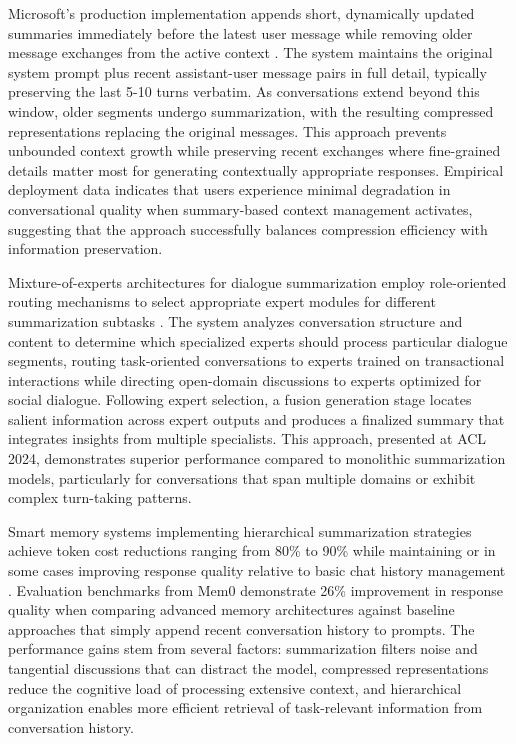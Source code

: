 \documentclass[11pt,letterpaper]{article}
\begin{document}
Microsoft's production implementation appends short, dynamically updated summaries immediately before the latest user message while removing older message exchanges from the active context \cite{microsoft2024infinite}. The system maintains the original system prompt plus recent assistant-user message pairs in full detail, typically preserving the last 5-10 turns verbatim. As conversations extend beyond this window, older segments undergo summarization, with the resulting compressed representations replacing the original messages. This approach prevents unbounded context growth while preserving recent exchanges where fine-grained details matter most for generating contextually appropriate responses. Empirical deployment data indicates that users experience minimal degradation in conversational quality when summary-based context management activates, suggesting that the approach successfully balances compression efficiency with information preservation.

Mixture-of-experts architectures for dialogue summarization employ role-oriented routing mechanisms to select appropriate expert modules for different summarization subtasks \cite{wang2024dialogue}. The system analyzes conversation structure and content to determine which specialized experts should process particular dialogue segments, routing task-oriented conversations to experts trained on transactional interactions while directing open-domain discussions to experts optimized for social dialogue. Following expert selection, a fusion generation stage locates salient information across expert outputs and produces a finalized summary that integrates insights from multiple specialists. This approach, presented at ACL 2024, demonstrates superior performance compared to monolithic summarization models, particularly for conversations that span multiple domains or exhibit complex turn-taking patterns.

Smart memory systems implementing hierarchical summarization strategies achieve token cost reductions ranging from 80\% to 90\% while maintaining or in some cases improving response quality relative to basic chat history management \cite{mem0ai2025guide}. Evaluation benchmarks from Mem0 demonstrate 26\% improvement in response quality when comparing advanced memory architectures against baseline approaches that simply append recent conversation history to prompts. The performance gains stem from several factors: summarization filters noise and tangential discussions that can distract the model, compressed representations reduce the cognitive load of processing extensive context, and hierarchical organization enables more efficient retrieval of task-relevant information from conversation history.
\end{document}

